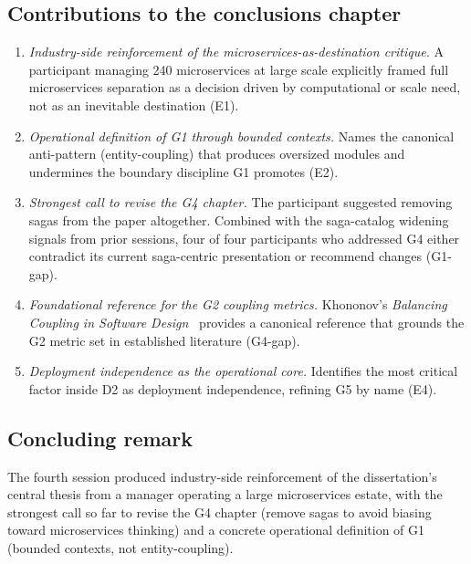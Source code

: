 \subsection*{Contributions to the conclusions chapter}

\begin{enumerate}[itemsep=3pt,topsep=2pt]
  \item \emph{Industry-side reinforcement of the microservices-as-destination critique.} A participant managing 240 microservices at large scale explicitly framed full microservices separation as a decision driven by computational or scale need, not as an inevitable destination (E1).
  \item \emph{Operational definition of G1 through bounded contexts.} Names the canonical anti-pattern (entity-coupling) that produces oversized modules and undermines the boundary discipline G1 promotes (E2).
  \item \emph{Strongest call to revise the G4 chapter.} The participant suggested removing sagas from the paper altogether. Combined with the saga-catalog widening signals from prior sessions, four of four participants who addressed G4 either contradict its current saga-centric presentation or recommend changes (G1-gap).
  \item \emph{Foundational reference for the G2 coupling metrics.} Khononov's \emph{Balancing Coupling in Software Design}~\cite{khononov2024balancing} provides a canonical reference that grounds the G2 metric set in established literature (G4-gap).
  \item \emph{Deployment independence as the operational core.} Identifies the most critical factor inside D2 as deployment independence, refining G5 by name (E4).
\end{enumerate}

\subsection*{Concluding remark}

The fourth session produced industry-side reinforcement of the dissertation's central thesis from a manager operating a large microservices estate, with the strongest call so far to revise the G4 chapter (remove sagas to avoid biasing toward microservices thinking) and a concrete operational definition of G1 (bounded contexts, not entity-coupling).
